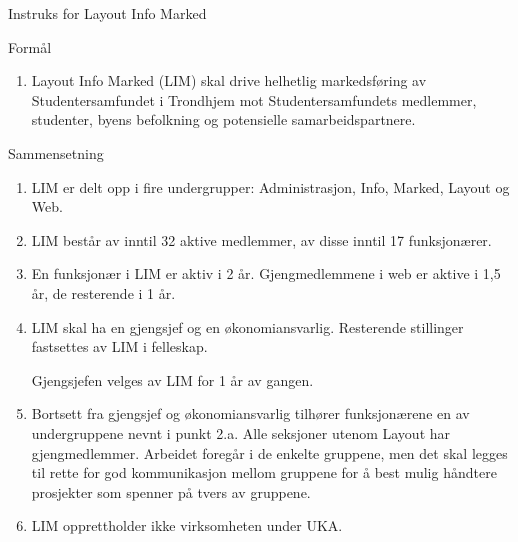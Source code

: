 \begin{instruks*}{Instruks for Layout Info Marked}

    \begin{instruksledd}{Formål}
        \begin{enumerate}
            \item Layout Info Marked (LIM) skal drive helhetlig markedsføring av Studentersamfundet
                i Trondhjem mot
                Studentersamfundets medlemmer, studenter, byens befolkning og potensielle samarbeidspartnere.
        \end{enumerate}
    \end{instruksledd}

    \begin{instruksledd}{Sammensetning}
        \begin{enumerate}
            \item LIM er delt opp i fire undergrupper: Administrasjon, Info, Marked, Layout og Web.
            \item LIM består av inntil 32 aktive medlemmer, av disse inntil 17 funksjonærer.
            \item En funksjonær i LIM er aktiv i 2 år. Gjengmedlemmene i web er aktive i 1,5 år, de
                resterende i 1 år.
            \item LIM skal ha en gjengsjef og en økonomiansvarlig. Resterende stillinger fastsettes
                av LIM i felleskap.

                Gjengsjefen velges av LIM for 1 år av gangen.
            \item Bortsett fra gjengsjef og
                økonomiansvarlig tilhører funksjonærene en av undergruppene nevnt i punkt 2.a.
                Alle
                seksjoner utenom Layout har gjengmedlemmer. Arbeidet foregår i de enkelte gruppene, men det skal
                legges til
                rette for god kommunikasjon mellom gruppene for å best mulig håndtere prosjekter som spenner på
                tvers av
                gruppene.
            \item LIM opprettholder ikke virksomheten under UKA.
        \end{enumerate}
    \end{instruksledd}


\end{instruks*}

